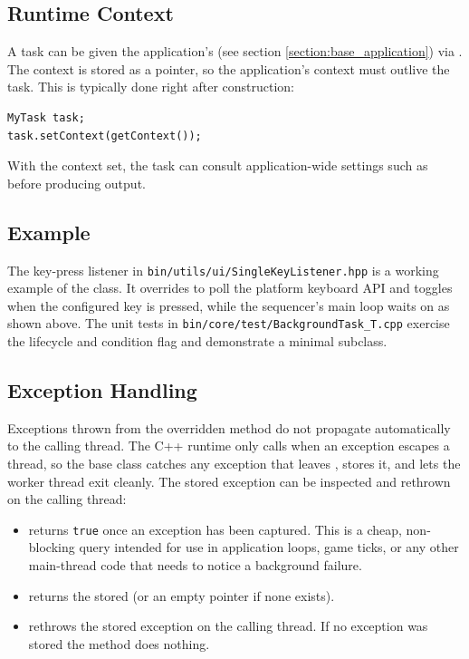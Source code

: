 \subsection{Runtime Context}

A task can be given the application's  (see section \ref{section:base_application}) via . The context is stored as a pointer, so the application's context must outlive the task. This is typically done right after construction:
\begin{lstlisting}[style=cppstyle]
MyTask task;
task.setContext(getContext());
\end{lstlisting}
With the context set, the task can consult application-wide settings such as  before producing output.

\subsection{Example}

The key-press listener in \texttt{bin/utils/ui/SingleKeyListener.hpp} is a working example of the class. It overrides  to poll the platform keyboard API and toggles  when the configured key is pressed, while the sequencer's main loop waits on  as shown above. The unit tests in \texttt{bin/core/test/BackgroundTask\_T.cpp} exercise the lifecycle and condition flag and demonstrate a minimal subclass.

\subsection{Exception Handling}
Exceptions thrown from the overridden  method do not propagate automatically to the calling thread. The C++ runtime only calls  when an exception escapes a thread, so the base class catches any exception that leaves , stores it, and lets the worker thread exit cleanly. The stored exception can be inspected and rethrown on the calling thread:
\begin{itemize}\itemsep0em
	\item {} returns \texttt{true} once an exception has been captured. This is a cheap, non-blocking query intended for use in application loops, game ticks, or any other main-thread code that needs to notice a background failure.
	\item {} returns the stored  (or an empty pointer if none exists).
	\item {} rethrows the stored exception on the calling thread. If no exception was stored the method does nothing.
\end{itemize}

